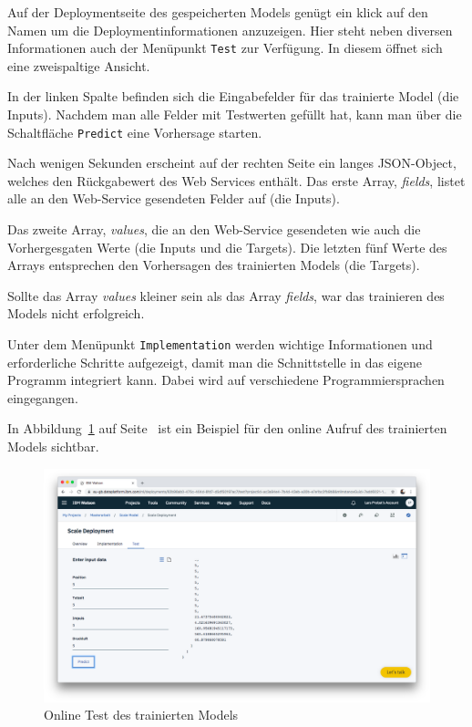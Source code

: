 Auf der Deploymentseite des gespeicherten Models genügt ein klick auf den Namen um die Deploymentinformationen anzuzeigen.
Hier steht neben diversen Informationen auch der Menüpunkt \texttt{Test} zur Verfügung. In diesem öffnet sich eine
zweispaltige Ansicht.

In der linken Spalte befinden sich die Eingabefelder für das trainierte Model (die Inputs). Nachdem man alle Felder mit
Testwerten gefüllt hat, kann man über die Schaltfläche \texttt{Predict} eine Vorhersage starten.

Nach wenigen Sekunden erscheint auf der rechten Seite ein langes JSON-Object, welches den Rückgabewert des Web Services
enthält. Das erste Array, \textit{fields}, listet alle an den Web-Service gesendeten Felder auf (die Inputs).

Das zweite Array, \textit{values}, die an den Web-Service gesendeten wie auch die Vorhergesgaten Werte (die Inputs und
die Targets). Die letzten fünf Werte des Arrays entsprechen den Vorhersagen des trainierten Models (die Targets).

Sollte das Array \textit{values} kleiner sein als das Array \textit{fields}, war das trainieren des Models nicht
erfolgreich.

Unter dem Menüpunkt \texttt{Implementation} werden wichtige Informationen und erforderliche Schritte aufgezeigt, damit
man die Schnittstelle in das eigene Programm integriert kann. Dabei wird auf verschiedene Programmiersprachen eingegangen.

In Abbildung~\ref{fig:umsetzung_deployment_test} auf Seite~\pageref{fig:umsetzung_deployment_test} ist ein Beispiel für
den online Aufruf des trainierten Models sichtbar.

\begin{figure}[h]
    \centering
    \includegraphics[width=\textwidth]{images/kapitel_3/deployment_test.png}
    \caption{Online Test des trainierten Models}
    \label{fig:umsetzung_deployment_test}
\end{figure}

